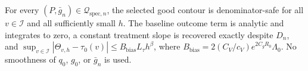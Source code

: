 For every \((P,\bar g_n)\in\mathcal Q_{\mathrm{spec},n}\), the selected good contour is denominator-safe for all \(v\in\mathcal I\) and all sufficiently small \(h\). The baseline outcome term is analytic and integrates to zero, a constant treatment slope is recovered exactly despite \(D_n\), and \(\sup_{v\in\mathcal I}|\Theta_{v,h}-\tau_0(v)|\le B_{\mathrm{bias}}L_\tau h^\beta\), where \(B_{\mathrm{bias}}=2(C_V/c_V)e^{2C_gR_0}\Lambda_0\). No smoothness of \(q_0\), \(g_0\), or \(\bar g_n\) is used.